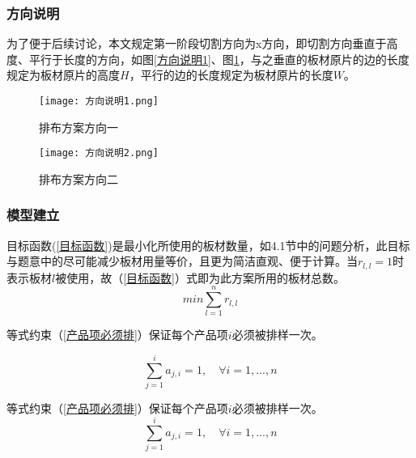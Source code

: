 \documentclass[bwprint]{gmcmthesis}
\begin{document}
\subsubsection{方向说明}
为了便于后续讨论，本文规定第一阶段切割方向为x方向，即切割方向垂直于高度、平行于长度的方向，如图\ref{方向说明1}、图\ref{方向说明2}，与之垂直的板材原片的边的长度规定为板材原片的高度$H$，平行的边的长度规定为板材原片的长度$W$。
\begin{figure}[!htbp]
    \centering
    \begin{minipage}{0.48\linewidth}
        \centering
        \texttt{[image: 方向说明1.png]}
        \caption{排布方案方向一}\label{方向说明1}
    \end{minipage}
    \begin{minipage}{0.48\linewidth}
        \centering
        \texttt{[image: 方向说明2.png]}
        \caption{排布方案方向二}\label{方向说明2}
    \end{minipage}
\end{figure}


\subsubsection{模型建立}



目标函数(\ref{目标函数})是最小化所使用的板材数量，如4.1节中的问题分析，此目标与题意中的尽可能减少板材用量等价，且更为简洁直观、便于计算。当$ r_{l,l}=1 $时表示板材$l$被使用，故（\ref{目标函数}）式即为此方案所用的板材总数。
\begin{equation}
    min \sum_{l=1}^{n}  r_{l,l} \label{目标函数}
 \end{equation}


等式约束（\ref{产品项必须排}）保证每个产品项$i$必须被排样一次。

\begin{equation}
    \sum_{j=1}^{i}  a_{j,i} =1,\quad \forall i=1,...,n \label{产品项必须排}
\end{equation}



等式约束（\ref{产品项必须排}）保证每个产品项$i$必须被排样一次。
\begin{equation}
    \sum_{j=1}^{i}  a_{j,i} =1,\quad \forall i=1,...,n \label{产品项必须排}
\end{equation}
\end{document}
